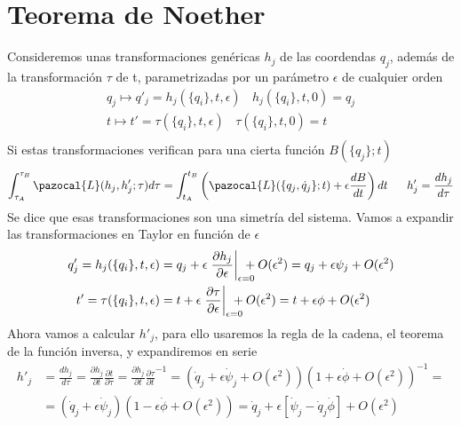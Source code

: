 \section{Teorema de Noether} 
Consideremos unas transformaciones genéricas $h_j$ de las coordendas $q_j$, además de la transformación $\tau$ de t, parametrizadas por un parámetro $\epsilon$ de cualquier orden
\begin{equation} \label{3.2.1}
    \begin{matrix}
        q_j \mapsto q'_j=h_j(\{q_i\},t,\epsilon) \ \ \ \ h_j(\{q_i\},t,0)=q_j \\
        t \mapsto t'=\tau(\{q_i\},t,\epsilon) \ \ \ \ \tau(\{q_i\},t,0)=t \\
    \end{matrix}
\end{equation} 
Si estas transformaciones verifican para una cierta función $B(\{q_j\};t)$
\begin{equation} \label{3.2.2}
    \int_{\tau_A}^{\tau_B} \pazocal{L}(h_j,h'_j;\tau)d \tau=\int_{t_A}^{t_B}\left(\pazocal{L}(\{q_j,\dot{q}_j\};t) + \epsilon\frac{dB}{dt}\right)dt \ \ \ \ \ h'_j = \frac{dh_j}{d\tau}
\end{equation} 
Se dice que esas transformaciones son una simetría del sistema. Vamos a expandir las transformaciones en Taylor en función de $\epsilon$
\begin{equation} \label{3.2.3}
    \begin{split}
        q_j' = h_j(\{q_i\},t,\epsilon) &= q_j + \epsilon\left.\frac{\partial h_j}{\partial \epsilon}\right|_{\epsilon=0} \hspace{-10pt}+ O(\epsilon^2) = q_j + \epsilon\psi_j + O(\epsilon^2) \\ 
        t' = \tau(\{q_i\},t,\epsilon) &= t + \epsilon\left.\frac{\partial \tau}{\partial \epsilon}\right|_{\epsilon=0} \hspace{-10pt}+ O(\epsilon^2) = t + \epsilon\phi + O(\epsilon^2)
    \end{split} 
\end{equation} 
Ahora vamos a calcular $h'_j$, para ello usaremos la regla de la cadena, el teorema de la función inversa, y expandiremos en serie
\begin{equation} \label{3.2.4}
    \begin{split}
        h'_j& =\frac{d h_j}{d\tau} = \frac{\partial h_j}{\partial t} \frac{\partial t}{\partial \tau} = \frac{\partial h_j}{\partial t} \frac{\partial \tau}{\partial t}^{-1} = \left(\dot{q}_j + \epsilon \dot{\psi}_j + O(\epsilon^2)\right)  \left(1+\epsilon \dot{\phi} + O(\epsilon^2)\right)^{-1} =  \\ 
        & =\left(\dot{q}_j + \epsilon \dot{\psi}_j\right) \left(1-\epsilon\dot{\phi} + O(\epsilon^2)\right) = \dot{q}_j + \epsilon \left[\dot{\psi}_j-\dot{q}_j \dot{\phi}\right] + O(\epsilon^2)
    \end{split} 
\end{equation} 
